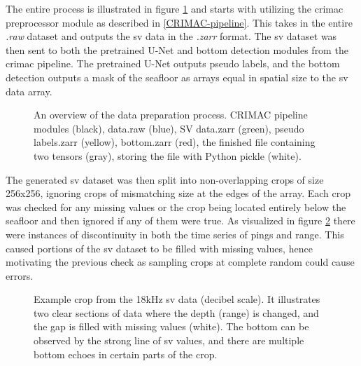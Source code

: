         
        The entire process is illustrated in figure \ref{data_generation_flowchart_fig} and starts with utilizing the \gls{crimac} preprocessor module as described in \ref{CRIMAC-pipeline}. This takes in the entire \textit{.raw} dataset and outputs the \gls{sv} data in the \textit{.zarr} format. The \gls{sv} dataset was then sent to both the pretrained U-Net and bottom detection modules from the \gls{crimac} pipeline. The pretrained U-Net outputs pseudo labels, and the bottom detection outputs a mask of the seafloor as arrays equal in spatial size to the \gls{sv} data array.
        \begin{figure}[H]
            \centering
            
            \caption[Data preparation process]{An overview of the data preparation process. CRIMAC pipeline modules (black), data.raw (blue), SV data.zarr (green), pseudo labels.zarr (yellow), bottom.zarr (red), the finished file containing two tensors (gray), storing the file with Python pickle (white).}
          	\medskip 
            \label{data_generation_flowchart_fig}
        \end{figure}
        The generated \gls{sv} dataset was then split into non-overlapping crops of size 256x256, ignoring crops of mismatching size at the edges of the array. Each crop was checked for any missing values or the crop being located entirely below the seafloor and then ignored if any of them were true. As visualized in figure \ref{data_bottom_nans_fig} there were instances of discontinuity in both the time series of pings and range. This caused portions of the \gls{sv} dataset to be filled with missing values, hence motivating the previous check as sampling crops at complete random could cause errors.
                \begin{figure}[H]
            \centering
            
            \caption[Missing values and bottom]{Example crop from the 18kHz \gls{sv} data (decibel scale). It illustrates two clear sections of data where the depth (range) is changed, and the gap is filled with missing values (white). The bottom can be observed by the strong line of \gls{sv} values, and there are multiple bottom echoes in certain parts of the crop.}
          	\medskip 
            \label{data_bottom_nans_fig}
        \end{figure}
        
